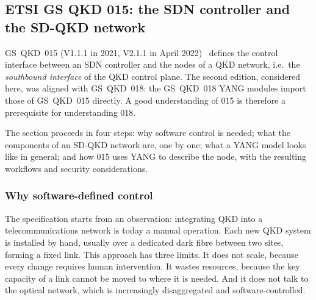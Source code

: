 \subsection{ETSI GS QKD 015: the SDN controller and the SD-QKD network}
\label{sec:qkd015}

GS~QKD~015 (V1.1.1 in 2021, V2.1.1 in April 2022)~\cite{qkd015} defines
the control interface between an SDN controller and the nodes of a QKD
network, i.e.\ the \emph{southbound interface} of the QKD control plane.
The second edition, considered here, was aligned with GS~QKD~018: the
GS~QKD~018 YANG modules import those of GS~QKD~015 directly. A good
understanding of 015 is therefore a prerequisite for understanding 018.

The section proceeds in four steps: why software control is needed; what
the components of an SD-QKD network are, one by one; what a YANG model
looks like in general; and how 015 uses YANG to describe the node, with the
resulting workflows and security considerations.

\subsubsection{Why software-defined control}

The specification starts from an observation: integrating QKD into a
telecommunications network is today a manual operation. Each new QKD
system is installed by hand, usually over a dedicated dark fibre between
two sites, forming a fixed link. This approach has three limits. It does
not scale, because every change requires human intervention. It wastes
resources, because the key capacity of a link cannot be moved to where it
is needed. And it does not talk to the optical network, which is
increasingly disaggregated and software-controlled.

